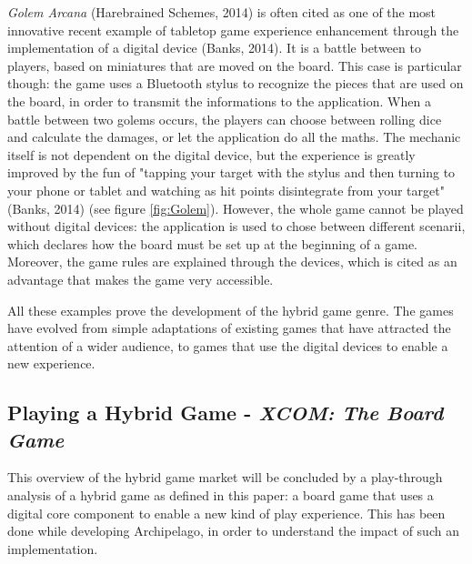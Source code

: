 \textit{Golem Arcana} (Harebrained Schemes, 2014)\cite{game:golem} is often cited as one of the most innovative recent example of tabletop game experience enhancement through the implementation of a digital device (Banks, 2014)\cite{web:golem}. It is a battle between to players, based on miniatures that are moved on the board. This case is particular though: the game uses a Bluetooth stylus to recognize the pieces that are used on the board, in order to transmit the informations to the application. When a battle between two golems occurs, the players can choose between rolling dice and calculate the damages, or let the application do all the maths. The mechanic itself is not dependent on the digital device, but the experience is greatly improved by the fun of  "tapping your target with the stylus and then turning to your phone or tablet and watching as hit points disintegrate from your target" (Banks, 2014)\cite{web:golem} (see figure \ref{fig:Golem}). However, the whole game cannot be played without digital devices: the application is used to chose between different scenarii, which declares how the board must be set up at the beginning of a game. Moreover, the game rules are explained through the devices, which is cited as an advantage that makes the game very accessible.

All these examples prove the development of the hybrid game genre. The games have evolved from simple adaptations of existing games that have attracted the attention of a wider audience, to games that use the digital devices to enable a new experience. 
\subsection{Playing a Hybrid Game - \textit{XCOM: The Board Game}}
This overview of the hybrid game market will be concluded by a play-through analysis of a hybrid game as defined in this paper: a board game that uses a digital core component to enable a new kind of play experience. This has been done while developing Archipelago, in order to understand the impact of such an implementation.

